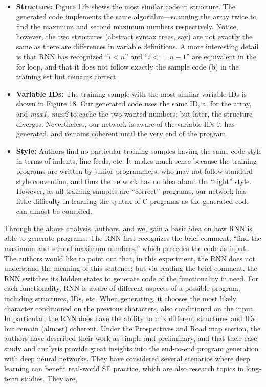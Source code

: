 \documentclass[conference, onecolumn, a4, 12pt]{IEEEtran}
\begin{document}
\begin{itemize}
	\item \textbf{Structure:} Figure 17b shows the most similar code in
	structure. The generated code implements the same
	algorithm—scanning the array twice to find the maximum
	and second maximum numbers respectively. Notice,
	however, the two structures (abstract syntax trees,
	say) are not exactly the same as there are differences in
	variable definitions. A more interesting detail is that
	RNN has recognized $“i<n”$ and $“i<=n-1”$ are equivalent
	in the for loop, and that it does not follow exactly the
	sample code (b) in the training set but remains correct.
	\item \textbf{Variable IDs:} The training sample with the most
	similar variable IDs is shown in Figure 18. Our generated
	code uses the same ID, a, for the array, and \textit{max1,
	max2} to cache the two wanted numbers; but later, the
	structure diverges. Nevertheless, our network is aware
	of the variable IDs it has generated, and remains coherent
	until the very end of the program.
	\item \textbf{Style:} Authors find no particular training samples having
	the same code style in terms of indents, line feeds, etc.
	It makes much sense because the training programs are written by junior programmers, who may not follow standard style convention, and thus the network has no idea about the “right” style. However, as all training
	samples are “correct” programs, our network has little difficulty in learning the syntax of C programs as the generated code can almost be compiled.
\end{itemize}

Through the above analysis, authors, and we, gain a basic idea on how RNN is able to generate programs. The RNN first recognizes the brief comment, “find the maximum and second maximum numbers,” which precedes the code as input. The authors would like to point out that, in this experiment, the RNN does not understand the meaning of this sentence; but via reading the brief comment, the RNN switches its hidden states to generate code of the functionality in need. For each functionality, RNN is aware of different aspects of a possible program, including structures, IDs, etc. When generating, it chooses the most likely character conditioned on the previous characters, also conditioned on the input. In particular, the RNN does have the ability to mix different structures and IDs but remain (almost) coherent.\newline
Under the Prospectives and Road map section, the authors have described their work as simple and preliminary, and that their case study and analysis provide great insights into the end-to-end program generation with deep neural networks. They have considered several scenarios where deep learning can benefit real-world SE
practice, which are also research topics in long-term studies. They are,
\end{document}
